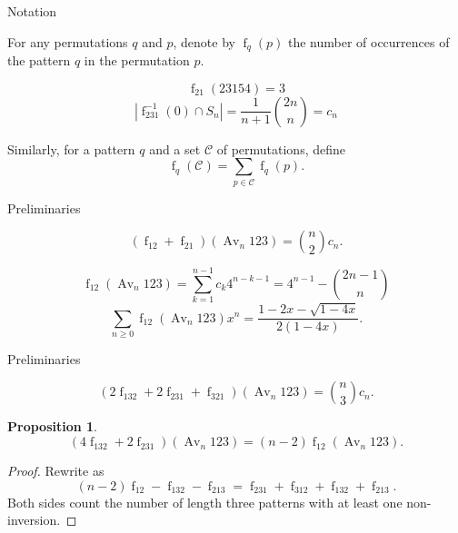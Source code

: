 \documentclass[xcolor=dvipsnames]{beamer}
\newcommand{\C}{\mathcal{C}}
\newcommand{\Avn}{\Av_n   123 }
\DeclareMathOperator{\Av}{Av}
\DeclareMathOperator{\num}{f}
\theoremstyle{definition}            %
\newtheorem*{proposition}{Proposition}
\begin{document}
\begin{frame}{Notation}
  \pause

  \begin{definition}
    For any permutations $q$ and $p$, denote by $\num_q (p)$ the
    number of occurrences of the pattern $q$ in the permutation $p$. 
  \end{definition}
  \pause
  
  \begin{example}
    $$ \num_{21} (23154) = 3$$
    \pause
    $$|\num_{231}^{-1}(0) \cap S_n| = \frac{1}{n+1} \binom{2n}{n} =
    c_n$$
  \end{example}
  \pause
  
  \begin{definition}
    Similarly, for a pattern $q$ and a set $\C$ of permutations,
    define 
    $$ \num_q (\C) = \sum_{p \in \C} \num_q(p). $$
  \end{definition}
\end{frame}


\begin{frame}{Preliminaries}
  \pause

  \begin{fact}
    $$ (\num_{12} + \num_{21})(\Avn)  = \binom{n}{2} c_n .$$ 
  \end{fact}
  \pause

  \begin{theorem}[Cheng, Eu, Fu 2007]
    $$\num_{12}( \Av_n 123) = \sum_{k=1}^{n-1} c_k 4^{n-k-1} = 
      4^{n-1} - \binom{2n-1}{n}$$
    $$\sum_{n \geq 0} \num_{12}(\Av_n 123) x^n = 
      \frac{1 - 2x - \sqrt{1-4x}}{2(1-4x)}.$$
  \end{theorem}
\end{frame}

\begin{frame}{Preliminaries}
  
  \begin{fact}
    $$ (2 \num_{132} + 2 \num_{231} +
      \num_{321})(\Avn) = \binom{n}{3} c_n.$$
  \end{fact}

  \pause

  \begin{proposition}
    $$ (4 \num_{132} + 2 \num_{231})(\Avn) =
      (n-2) \num_{12}(\Avn). $$
  \end{proposition}
  \pause

  \begin{proof}
    Rewrite as 
    $$ (n-2)\num_{12} - \num_{132} - \num_{213} = 
      \num_{231} + \num_{312}+ \num_{132} + \num_{213}. $$
    Both sides count the number of length three patterns with at least
    one non-inversion.
  \end{proof}

\end{frame}
\end{document}
